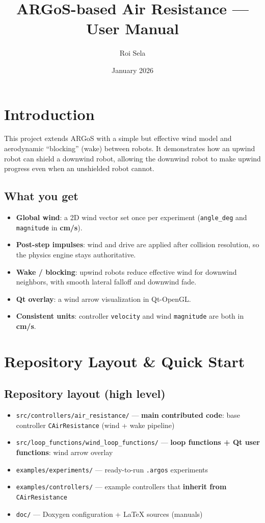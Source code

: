\documentclass[11pt,a4paper]{article}
\title{ARGoS-based Air Resistance --- User Manual}
\author{Roi Sela}
\date{January 2026}
\begin{document}
\maketitle
\newpage
\tableofcontents
\newpage

\section{Introduction}
This project extends ARGoS with a simple but effective wind model and aerodynamic ``blocking'' (wake) between robots.
It demonstrates how an upwind robot can shield a downwind robot, allowing the downwind robot to make upwind progress even when an unshielded robot cannot.

\subsection{What you get}
\begin{itemize}
  \item \textbf{Global wind}: a 2D wind vector set once per experiment (\texttt{angle\_deg} and \texttt{magnitude} in \textbf{cm/s}).
  \item \textbf{Post-step impulses}: wind and drive are applied after collision resolution, so the physics engine stays authoritative.
  \item \textbf{Wake / blocking}: upwind robots reduce effective wind for downwind neighbors, with smooth lateral falloff and downwind fade.
  \item \textbf{Qt overlay}: a wind arrow visualization in Qt-OpenGL.
  \item \textbf{Consistent units}: controller \texttt{velocity} and wind \texttt{magnitude} are both in \textbf{cm/s}.
\end{itemize}

\section{Repository Layout \& Quick Start}

\subsection{Repository layout (high level)}
\begin{itemize}
  \item \texttt{src/controllers/air\_resistance/} --- \textbf{main contributed code}: base controller \texttt{CAirResistance} (wind + wake pipeline)
  \item \texttt{src/loop\_functions/wind\_loop\_functions/} --- \textbf{loop functions + Qt user functions}: wind arrow overlay
  \item \texttt{examples/experiments/} --- ready-to-run \texttt{.argos} experiments
  \item \texttt{examples/controllers/} --- example controllers that \textbf{inherit from} \texttt{CAirResistance}
  \item \texttt{doc/} --- Doxygen configuration + LaTeX sources (manuals)
\end{itemize}
\end{document}
